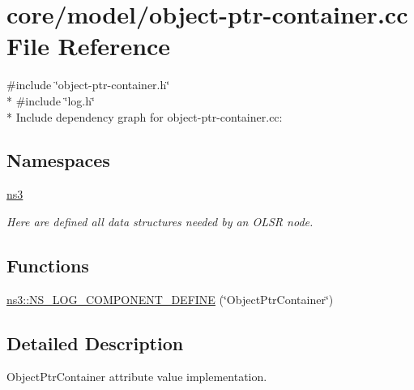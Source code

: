 \hypertarget{object-ptr-container_8cc}{}\section{core/model/object-\/ptr-\/container.cc File Reference}
\label{object-ptr-container_8cc}
{\ttfamily \#include \char`\"{}object-\/ptr-\/container.\+h\char`\"{}}\\*
{\ttfamily \#include \char`\"{}log.\+h\char`\"{}}\\*
Include dependency graph for object-\/ptr-\/container.cc\+:
\subsection*{Namespaces}
\begin{DoxyCompactItemize}
\item 
 \hyperlink{namespacens3}{ns3}
\begin{DoxyCompactList}\small\item\em Here are defined all data structures needed by an O\+L\+SR node. \end{DoxyCompactList}\end{DoxyCompactItemize}
\subsection*{Functions}
\begin{DoxyCompactItemize}
\item 
\hyperlink{namespacens3_a908543d46ca2549e6e2354ccf889a3c8}{ns3\+::\+N\+S\+\_\+\+L\+O\+G\+\_\+\+C\+O\+M\+P\+O\+N\+E\+N\+T\+\_\+\+D\+E\+F\+I\+NE} (\char`\"{}Object\+Ptr\+Container\char`\"{})
\end{DoxyCompactItemize}


\subsection{Detailed Description}
Object\+Ptr\+Container attribute value implementation. 